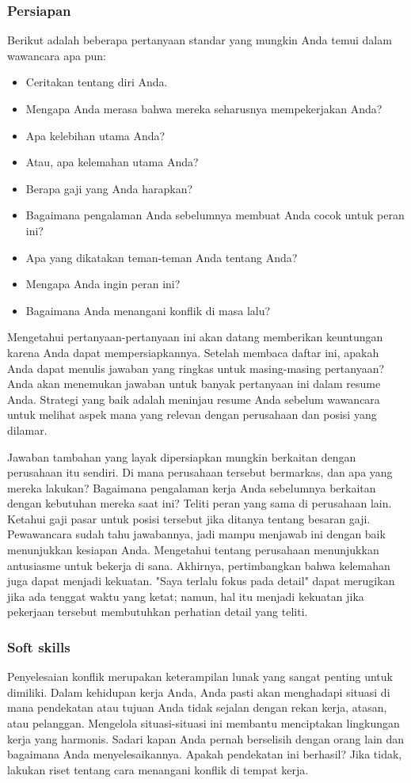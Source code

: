 \documentclass{article}
\begin{document}
\subsubsection{Persiapan}
Berikut adalah beberapa pertanyaan standar yang mungkin Anda temui dalam wawancara apa pun:
\begin{itemize}
    \item Ceritakan tentang diri Anda.
    \item Mengapa Anda merasa bahwa mereka seharusnya mempekerjakan Anda?
    \item Apa kelebihan utama Anda?
    \item Atau, apa kelemahan utama Anda?
    \item Berapa gaji yang Anda harapkan?
    \item Bagaimana pengalaman Anda sebelumnya membuat Anda cocok untuk peran ini?
    \item Apa yang dikatakan teman-teman Anda tentang Anda?
    \item Mengapa Anda ingin peran ini?
    \item Bagaimana Anda menangani konflik di masa lalu?
\end{itemize}

Mengetahui pertanyaan-pertanyaan ini akan datang memberikan keuntungan karena Anda dapat mempersiapkannya. Setelah membaca daftar ini, apakah Anda dapat menulis jawaban yang ringkas untuk masing-masing pertanyaan? Anda akan menemukan jawaban untuk banyak pertanyaan ini dalam resume Anda. Strategi yang baik adalah meninjau resume Anda sebelum wawancara untuk melihat aspek mana yang relevan dengan perusahaan dan posisi yang dilamar.

Jawaban tambahan yang layak dipersiapkan mungkin berkaitan dengan perusahaan itu sendiri. Di mana perusahaan tersebut bermarkas, dan apa yang mereka lakukan? Bagaimana pengalaman kerja Anda sebelumnya berkaitan dengan kebutuhan mereka saat ini? Teliti peran yang sama di perusahaan lain. Ketahui gaji pasar untuk posisi tersebut jika ditanya tentang besaran gaji. Pewawancara sudah tahu jawabannya, jadi mampu menjawab ini dengan baik menunjukkan kesiapan Anda. Mengetahui tentang perusahaan menunjukkan antusiasme untuk bekerja di sana. Akhirnya, pertimbangkan bahwa kelemahan juga dapat menjadi kekuatan. "Saya terlalu fokus pada detail" dapat merugikan jika ada tenggat waktu yang ketat; namun, hal itu menjadi kekuatan jika pekerjaan tersebut membutuhkan perhatian detail yang teliti.

\subsubsection{Soft skills}
Penyelesaian konflik merupakan keterampilan lunak yang sangat penting untuk dimiliki. Dalam kehidupan kerja Anda, Anda pasti akan menghadapi situasi di mana pendekatan atau tujuan Anda tidak sejalan dengan rekan kerja, atasan, atau pelanggan. Mengelola situasi-situasi ini membantu menciptakan lingkungan kerja yang harmonis. Sadari kapan Anda pernah berselisih dengan orang lain dan bagaimana Anda menyelesaikannya. Apakah pendekatan ini berhasil? Jika tidak, lakukan riset tentang cara menangani konflik di tempat kerja.
\end{document}
